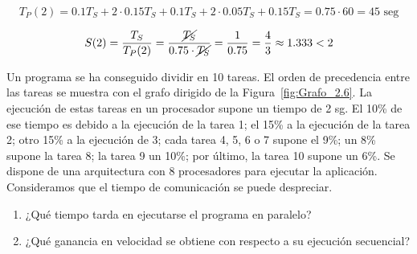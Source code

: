 \begin{ejercicio}
\begin{enumerate}
            \begin{equation*}
                T_P(2) = 0.1T_S + 2\cdot 0.15T_S + 0.1T_S + 2\cdot 0.05 T_S + 0.15 T_S = 0.75 \cdot 60 = 45 \text{\ seg}
            \end{equation*}

            \begin{equation*}
                S(2) = \dfrac{T_S}{T_P(2)} = \dfrac{\cancel{T_S}}{0.75\cdot \cancel{T_S}} = \frac{1}{0.75} = \frac{4}{3} \approx 1.333 < 2
            \end{equation*}
        
    \end{enumerate}
    

\end{ejercicio}


\begin{ejercicio} \label{ej:2.6}
    Un programa se ha conseguido dividir en 10 tareas. El orden de precedencia entre las tareas se
    muestra con el grafo dirigido de la Figura~\ref{fig:Grafo_2.6}. La ejecución de estas tareas en un procesador supone un tiempo de 2 sg.
    El 10\% de ese tiempo es debido a la ejecución de la tarea 1; el 15\% a la ejecución de la tarea 2; otro 15\% a la ejecución de 3;
    cada tarea 4, 5, 6 o 7 supone el 9\%; un 8\% supone la tarea 8; la tarea 9 un 10\%; por último, la tarea 10 supone un 6\%.
    Se dispone de una arquitectura con 8 procesadores para ejecutar la aplicación. Consideramos que el tiempo de comunicación se puede despreciar.
    \begin{enumerate}
        \item ¿Qué tiempo tarda en ejecutarse el programa en paralelo?
        \item ¿Qué ganancia en velocidad se obtiene con respecto a su ejecución secuencial?
    \end{enumerate}
    \begin{figure}
        \centering
\end{figure}
\end{ejercicio}
